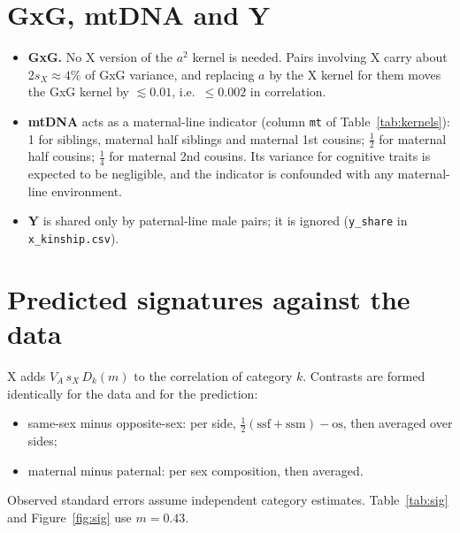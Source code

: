 \documentclass[11pt]{article}
\begin{document}
\section{GxG, mtDNA and Y}
\begin{itemize}
  \item \textbf{GxG.} No X version of the $a^2$ kernel is needed. Pairs involving X carry about $2s_X\approx4\%$
    of GxG variance, and replacing $a$ by the X kernel for them moves the GxG kernel by $\lesssim0.01$, i.e.\
    $\le0.002$ in correlation.
  \item \textbf{mtDNA} acts as a maternal-line indicator (column \texttt{mt} of Table~\ref{tab:kernels}): 1 for
    siblings, maternal half siblings and maternal 1st cousins; $\tfrac12$ for maternal half cousins; $\tfrac14$
    for maternal 2nd cousins. Its variance for cognitive traits is expected to be negligible, and the
    indicator is confounded with any maternal-line environment.
  \item \textbf{Y} is shared only by paternal-line male pairs; it is ignored (\texttt{y\_share} in
    \texttt{x\_kinship.csv}).
\end{itemize}

\section{Predicted signatures against the data}\label{sec:sig}
X adds $V_A\,s_X\,D_k(m)$ to the correlation of category $k$. Contrasts are formed identically for the data
and for the prediction:
\begin{itemize}
  \item same-sex minus opposite-sex: per side, $\tfrac12(\mathrm{ssf}+\mathrm{ssm})-\mathrm{os}$, then
    averaged over sides;
  \item maternal minus paternal: per sex composition, then averaged.
\end{itemize}
Observed standard errors assume independent category estimates. Table~\ref{tab:sig} and
Figure~\ref{fig:sig} use $m=0.43$.
\end{document}
